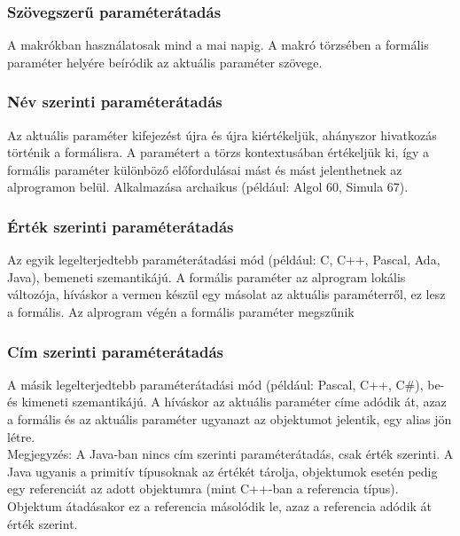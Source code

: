 \documentclass[12pt,margin=0px]{article}
\begin{document}
	\subsubsection{Szövegszerű paraméterátadás}
	
	A makrókban használatosak mind a mai napig. A makró törzsében a formális paraméter helyére beíródik az aktuális paraméter szövege.
	
	\subsubsection{Név szerinti paraméterátadás}
	
    Az aktuális paraméter kifejezést újra és újra kiértékeljük, ahányszor hivatkozás történik a formálisra. A paramétert a törzs kontextusában értékeljük ki, így a formális paraméter különböző előfordulásai mást és mást jelenthetnek az alprogramon belül.
	Alkalmazása archaikus (például: Algol 60, Simula 67).
	
	\subsubsection{Érték szerinti paraméterátadás}
	
    Az egyik legelterjedtebb paraméterátadási mód (például: C, C++, Pascal, Ada, Java), bemeneti szemantikájú. A formális paraméter az alprogram lokális változója, híváskor a vermen készül egy másolat az aktuális paraméterről, ez lesz a formális. Az alprogram végén a formális paraméter megszűnik
	
	\subsubsection{Cím szerinti paraméterátadás}
	
    A másik legelterjedtebb paraméterátadási mód (például: Pascal, C++, C\#), be- és kimeneti szemantikájú. A híváskor az aktuális paraméter címe adódik át, azaz a formális és az aktuális paraméter ugyanazt az objektumot jelentik, egy alias jön létre.\\
	
    \noindent Megjegyzés: A Java-ban nincs cím szerinti paraméterátadás, csak érték szerinti. A Java ugyanis a primitív típusoknak az értékét tárolja, objektumok esetén pedig egy referenciát az adott objektumra (mint C++-ban a referencia típus).  Objektum átadásakor ez a referencia másolódik le, azaz a referencia adódik át érték szerint.\\
	
\end{document}
